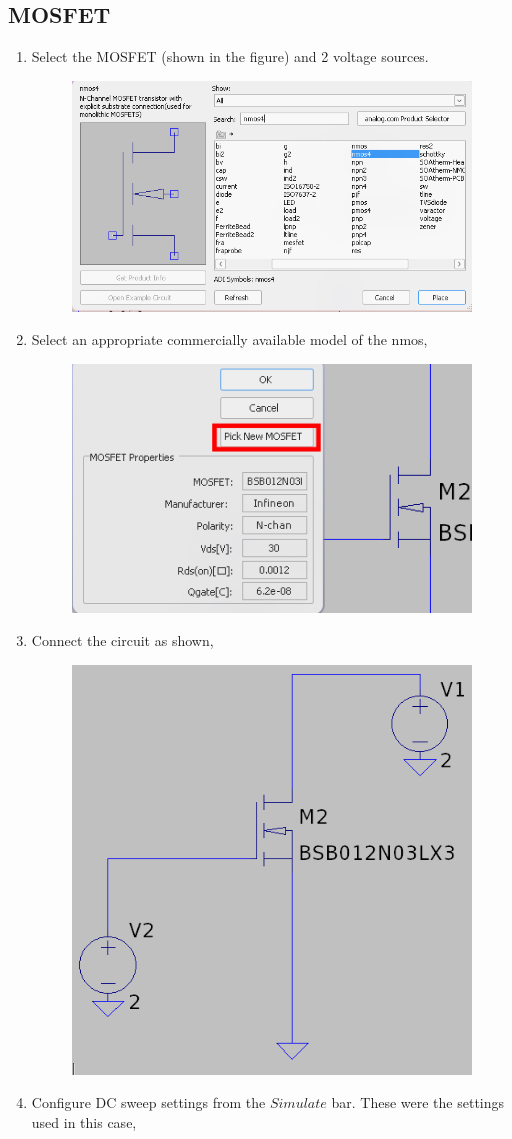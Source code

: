 \documentclass[12pt,a4paper]{report}
\begin{document}
\subsection{MOSFET}
\begin{enumerate}
    \item Select the MOSFET (shown in the figure) and 2 voltage sources.
    \begin{figure}[h!]
        \centering
        \includegraphics[width = 0.6\linewidth]{Simluations/Experiment_1/figs/component-nmos.png}
        \label{fig:placeholder}
    \end{figure}
    \item Select an appropriate commercially available model of the nmos,
    \begin{figure}[h!]
        \centering
        \includegraphics[width=0.5\linewidth]{Simluations/Experiment_1/figs/mosfet-model.png}
        \label{fig:placeholder}
    \end{figure}
    \item Connect the circuit as shown,
    \pagebreak
    \begin{figure}[h!]
        \centering
        \includegraphics[width=0.5\linewidth]{Simluations/Experiment_1/figs/mosfet-circuit.png}
        \label{fig:placeholder}
    \end{figure}
    \item Configure DC sweep settings from the $Simulate$ bar. These were the settings used in this case,
  \begin{figure}[h!]
  \centering
  

\end{figure}
\end{enumerate}
\end{document}
